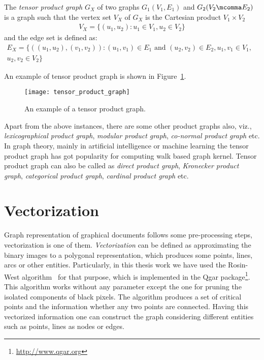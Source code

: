 \begin{definition}
The \emph{tensor product graph} $G_X$ of two graphs $G_1(V_1,E_1)$ and $G_2(V_2\mcomma E_2)$ is a graph such that the vertex set $V_X$ of $G_X$ is the Cartesian product $V_1\times V_2$ \ie
\begin{align*}
V_X =\lbrace (u_1,u_2):u_1\in V_1, u_2\in V_2\rbrace
\end{align*}
and the edge set is defined as:
\begin{align*}
E_X =\lbrace ((u_1,u_2),(v_1,v_2)):(u_1,v_1)\in E_1\text{ and }(u_2,v_2)\in E_2,u_1,v_1\in V_1,&\\
u_2,v_2\in V_2\rbrace&
\end{align*}
\end{definition}
An example of tensor product graph is shown in Figure~\ref{fig:gm:tensor_product_graph}.

\begin{figure}[h!]
\begin{center}
\texttt{[image: tensor\_product\_graph]}
\caption{An example of a tensor product graph.}
\label{fig:gm:tensor_product_graph}
\end{center}
\end{figure}

Apart from the above instances, there are some other product graphs also, viz., \emph{lexicographical product graph}, \emph{modular product graph}, \emph{co-normal product graph} etc. In graph theory, mainly in artificial intelligence or machine learning the tensor product graph has got popularity for computing walk based graph kernel. Tensor product graph can also be called as \emph{direct product graph}, \emph{Kronecker product graph}, \emph{categorical product graph}, \emph{cardinal product graph} etc.

\section{Vectorization}
\label{sec:gm:vect}
Graph representation of graphical documents follows some pre-processing steps, vectorization is one of them. \emph{Vectorization} can be defined as approximating the binary images to a polygonal representation, which produces some points, lines, arcs or other entities. Particularly, in this thesis work we have used the Rosin-West algorithm~\cite{Rosin1989} for that purpose, which is implemented in the Qgar package\footnote{\url{http://www.qgar.org}}. This algorithm works without any parameter except the one for pruning the isolated components of black pixels. The algorithm produces a set of critical points and the information whether any two points are connected. Having this vectorized information one can construct the graph considering different entities such as points, lines as nodes or edges.

